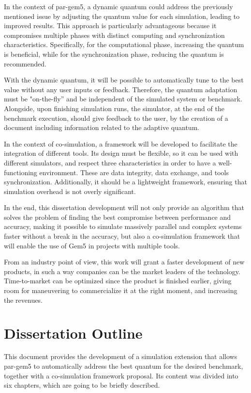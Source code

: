 In the context of par-gem5, a dynamic quantum could address the previously mentioned issue by adjusting the quantum value for each simulation, 
leading to improved results. 
This approach is particularly advantageous because it compromises multiple phases with distinct computing and synchronization 
characteristics. Specifically, for the computational phase, increasing the quantum is beneficial, while for the synchronization phase, 
reducing the quantum is recommended.

With the dynamic quantum, it will be possible to automatically tune to the best value without any user inputs or feedback. 
Therefore, the quantum adaptation must be "on-the-fly” and be independent of the simulated system or benchmark. 
Alongside, upon finishing simulation runs, the simulator, at the end of the benchmark execution, should give feedback to the user, 
by the creation of a document including information related to the adaptive quantum.

In the context of co-simulation, a framework will be developed to facilitate the integration of different tools. Its design 
must be flexible, so it can be used with different simulators, and respect three characteristics in order to have a well-functioning
environment. These are data integrity, data exchange, and tools synchronization. Additionally, it should be a lightweight framework, 
ensuring that simulation overhead is not overly significant.

In the end, this dissertation development will not only provide an algorithm that solves the problem of 
finding the best compromise between performance and accuracy, making it possible to simulate 
massively parallel and complex systems faster without a break in the accuracy, but also a co-simulation framework that will enable the use 
of Gem5 in projects with multiple tools.

From an industry point of view, this work will grant a faster development of new products, in such a way companies can be the market leaders 
of the technology. Time-to-market can be optimized since the product is finished earlier, giving room for maneuvering to commercialize it at the 
right moment, and increasing the revenues.
 
\section{Dissertation Outline}

This document provides the development of a simulation extension that allows par-gem5 to automatically address the best quantum for the desired 
benchmark, together with a co-simulation framework proposal. Its content was divided into six chapters, which are going to be briefly described.


